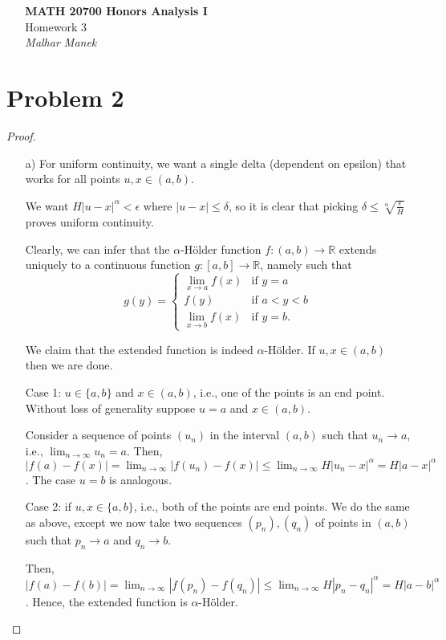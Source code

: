 \documentclass[11pt]{article}
\newcommand{\bbR}{\mathbb{R}}
\renewcommand{\_}[1]{\underline{ #1 }}
\theoremstyle{definition}
\numberwithin{equation}{subsection}
\begin{document}
\begin{center}
    {\LARGE\bfseries MATH 20700 Honors Analysis I}\\[6pt]
    {\Large Homework 3}\\[6pt]
    {\Large\itshape Malhar Manek}
\end{center}

\bigskip

\section*{Problem 2}
\begin{proof}
\begin{enumerate}
    \item[a)] For uniform continuity, we want a single delta (dependent on epsilon) that works for all points $u,x \in (a,b)$.

    We want $H|u-x|^\alpha <\epsilon$ where $|u-x|\leq \delta$, so it is clear that picking $\delta \leq \sqrt[\alpha]{\frac{\epsilon}{H}}$ proves uniform continuity.

    Clearly, we can infer that the $\alpha$-Hölder function $f: (a,b) \to \bbR$ extends uniquely to a continuous function $g:[a,b] \to \bbR$, namely such that $$
g(y) =
\begin{cases}
  \displaystyle \lim_{x\to a} f(x) & \text{if } y = a \\
  f(y) & \text{if } a < y < b \\
  \displaystyle \lim_{x\to b} f(x) & \text{if } y = b.
\end{cases}
$$

We claim that the extended function is indeed $\alpha$-Hölder. If $u,x \in (a,b)$ then we are done. 

Case 1: $u\in \{a,b\}$ and $x\in (a,b)$, i.e., one of the points is an end point. Without loss of generality suppose $u=a$ and $x\in (a,b)$. 

Consider a sequence of points $(u_n)$ in the interval $(a,b)$ such that $u_n \to a$, i.e., $\displaystyle \lim_{n\to \infty} u_n =a$. Then, $|f(a)-f(x)|=\displaystyle \lim_{n\to \infty} |f(u_n)-f(x)|\leq \displaystyle \lim_{n\to \infty} H|u_n-x|^\alpha = H|a-x|^\alpha$. The case $u=b$ is analogous.

Case 2: if $u,x\in \{a,b\}$, i.e., both of the points are end points. We do the same as above, except we now take two sequences $(p_n),(q_n)$ of points in $(a,b)$ such that $p_n\to a$ and $q_n \to b$. 

Then, $|f(a)-f(b)|=\displaystyle \lim_{n\to \infty} |f(p_n)-f(q_n)|\leq \displaystyle \lim_{n\to \infty} H|p_n-q_n|^\alpha = H|a-b|^\alpha$. Hence, the extended function is $\alpha$-Hölder.


\end{enumerate}
\end{proof}
\end{document}
